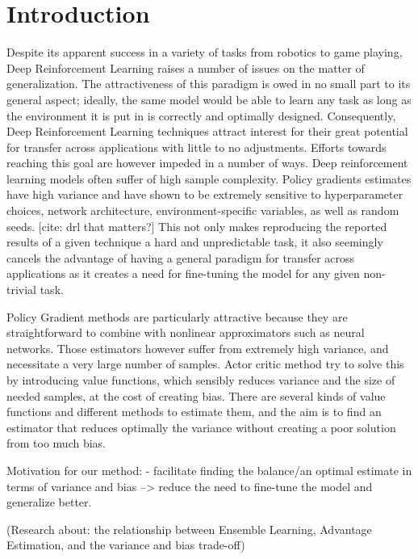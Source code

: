 \section{Introduction}
\label{sec:intro}

Despite its apparent success in a variety of tasks from robotics to game playing, Deep Reinforcement Learning raises a number of issues on the matter of generalization. The attractiveness of this paradigm is owed in no small part to its general aspect; ideally, the same model would be able to learn any task as long as the environment it is put in is correctly and optimally designed. Consequently, Deep Reinforcement Learning techniques attract interest for their great potential for transfer across applications with little to no adjustments. Efforts towards reaching this goal are however impeded in a number of ways. 
Deep reinforcement learning models often suffer of high sample complexity. Policy gradients estimates have high variance and have shown  to be extremely sensitive to hyperparameter choices, network architecture, environment-specific variables, as well as random seeds. [cite: drl that matters?] %
 This not only makes reproducing the reported results of a given technique a hard and unpredictable task, it also seemingly cancels the advantage of having a general paradigm for transfer across applications as it creates a need for fine-tuning the model for any given non-trivial task.

Policy Gradient methods are particularly attractive because they are straightforward to combine with nonlinear approximators such as neural networks. Those estimators however suffer from extremely high variance, and necessitate a very large number of samples. Actor critic method try to solve this by introducing value functions, which sensibly reduces variance and the size of needed samples, at the cost of creating bias. There are several kinds of value functions and different methods to estimate them, and the aim is to find an estimator that reduces optimally the variance without creating a poor solution from too much bias.

Motivation for our method:
- facilitate finding the balance/an optimal estimate in terms of variance and bias --> reduce the need to fine-tune the model and generalize better.

(Research about: the relationship between Ensemble Learning, Advantage Estimation, and the variance and bias trade-off)

